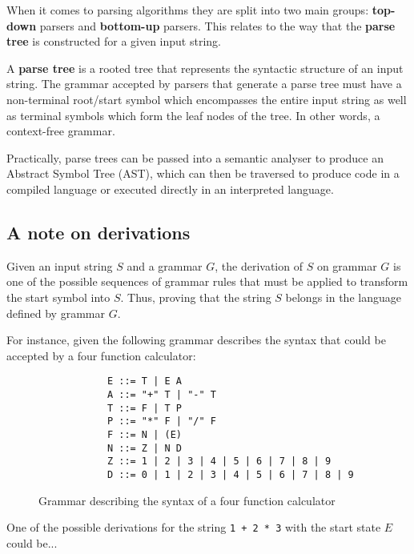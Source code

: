 When it comes to parsing algorithms they are split into two main groups: \textbf{top-down} parsers and \textbf{bottom-up} parsers. This relates to the way that the \textbf{parse tree} is constructed for a given input string.

A \textbf{parse tree} is a rooted tree that represents the syntactic structure of an input string. The grammar accepted by parsers that generate a parse tree must have a non-terminal root/start symbol which encompasses the entire input string as well as terminal symbols which form the leaf nodes of the tree. In other words, a context-free grammar.

Practically, parse trees can be passed into a semantic analyser to produce an Abstract Symbol Tree (AST), which can then be traversed to produce code in a compiled language or executed directly in an interpreted language.

\subsection{A note on derivations}

Given an input string $S$ and a grammar $G$, the derivation of $S$ on grammar $G$ is one of the possible sequences of grammar rules that must be applied to transform the start symbol into $S$. Thus, proving that the string $S$ belongs in the language defined by grammar $G$.

For instance, given the following grammar describes the syntax that could be accepted by a four function calculator:

\begin{figure}[h]
    \begin{center}
        \begin{verbatim}
            E ::= T | E A
            A ::= "+" T | "-" T
            T ::= F | T P
            P ::= "*" F | "/" F
            F ::= N | (E)
            N ::= Z | N D
            Z ::= 1 | 2 | 3 | 4 | 5 | 6 | 7 | 8 | 9
            D ::= 0 | 1 | 2 | 3 | 4 | 5 | 6 | 7 | 8 | 9
        \end{verbatim}
    \end{center}
    \vspace{-1.5em}
    \caption{\label{fig:3.3}Grammar describing the syntax of a four function calculator}
\end{figure}

\pagebreak

One of the possible derivations for the string \verb|1 + 2 * 3| with the start state $E$ could be...

